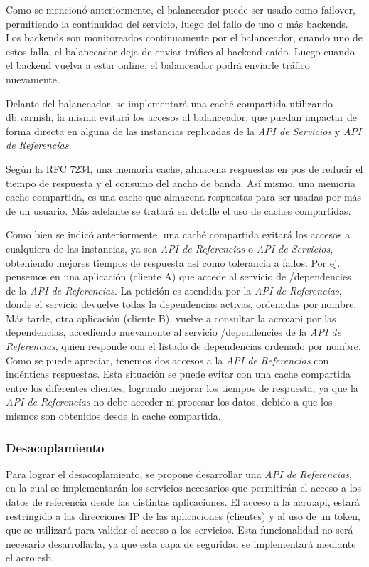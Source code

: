 Como se mencionó anteriormente, el balanceador puede ser usado como failover, permitiendo la continuidad del servicio, luego del fallo de uno o más backends.  Los backends son monitoreados continuamente por el balanceador, cuando uno de estos falla, el balanceador deja de enviar tráfico al backend caído.  Luego cuando el backend vuelva a estar online, el balanceador podrá enviarle tráfico nuevamente.

Delante del balanceador, se implementará una caché compartida utilizando \gls{db:varnish}, la misma evitará los accesos al balanceador, que puedan impactar de forma directa en alguna de las instancias replicadas de la \textit{API de Servicios} y \textit{API de Referencias}.

Según la RFC 7234, una memoria cache, almacena respuestas en pos de reducir el tiempo de respuesta y el consumo del ancho de banda. Así mismo, una memoria cache compartida, es una cache que almacena respuestas para ser usadas por más de un usuario. Más adelante se tratará en detalle el uso de caches compartidas.

Como bien se indicó anteriormente, una caché compartida evitará los accesos a cualquiera de las instancias, ya sea \textit{API de Referencias} o \textit{API de Servicios}, obteniendo mejores tiempos de respuesta así como tolerancia a fallos.  Por ej. pensemos en una aplicación (cliente A) que accede al servicio de /dependencies de la \textit{API de Referencias}.  La petición es atendida por la \textit{API de Referencias}, donde el servicio devuelve todas la dependencias activas, ordenadas por nombre.  Más tarde, otra aplicación (cliente B), vuelve a consultar la \gls{acro:api} por las dependencias, accediendo nuevamente al servicio /dependencies de la \textit{API de Referencias}, quien responde con el listado de dependencias ordenado por nombre.  Como se puede apreciar, tenemos dos accesos a la \textit{API de Referencias} con indénticas respuestas.  Esta situación se puede evitar con una cache compartida entre los diferentes clientes, logrando mejorar los tiempos de respuesta, ya que la \textit{API de Referencias} no debe acceder ni procesar los datos, debido a que los mismos son obtenidos desde la cache compartida.


\subsubsection{Desacoplamiento}

Para lograr el desacoplamiento, se propone desarrollar una \textit{API de Referencias}, en la cual se implementarán los servicios necesarios que permitirán el acceso a los datos de referencia desde las distintas aplicaciones.  El acceso a la \gls{acro:api}, estará restringido a las direcciones IP de las aplicaciones (clientes) y al uso de un token, que se utilizará para validar el acceso a los servicios.  Esta funcionalidad no será necesario desarrollarla, ya que esta capa de seguridad se implementará mediante el \gls{acro:esb}.

